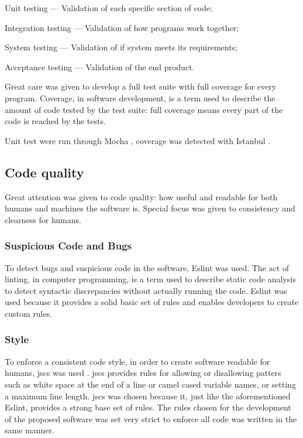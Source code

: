 \begin{enumerate}
\begin{aenumerate}
\item
  Unit testing --- Validation of each specific section of code;
\item
  Integration testing --- Validation of how programs work together;
\item
  System testing --- Validation of if system meets its requirements;
\item
  Acceptance testing --- Validation of the end product.
\end{aenumerate}

Great care was given to develop a full test suite with full coverage for
every program. Coverage, in software development, is a term used to
describe the amount of code tested by the test suite: full coverage
means every part of the code is reached by the tests.

Unit test were run through Mocha
\autocite{visionmedia/mocha-source-code}, coverage was detected with
Istanbul \autocite{gotwarlost/istanbul-source-code}.

\subsection{Code quality}\label{code-quality}

Great attention was given to code quality: how useful and readable for
both humans and machines the software is. Special focus was given to
consistency and clearness for humans.

\subsubsection{Suspicious Code and Bugs}\label{suspicious-code-and-bugs}

To detect bugs and suspicious code in the software, Eslint
\autocite{eslint/eslint-source-code} was used. The act of linting, in
computer programming, is a term used to describe static code analysis to
detect syntactic discrepancies without actually running the code. Eslint
was used because it provides a solid basic set of rules and enables
developers to create custom rules.

\subsubsection{Style}\label{style}

To enforce a consistent code style, in order to create software readable
for humans, \gls{jscs} was used
\autocite{mdevils/node-jscs-source-code}. \gls{jscs} provides rules for
allowing or disallowing patters such as white space at the end of a line
or camel cased variable names, or setting a maximum line length.
\gls{jscs} was chosen because it, just like the aforementioned Eslint,
provides a strong base set of rules. The rules chosen for the
development of the proposed software was set very strict to enforce all
code was written in the same manner.


\end{enumerate}

